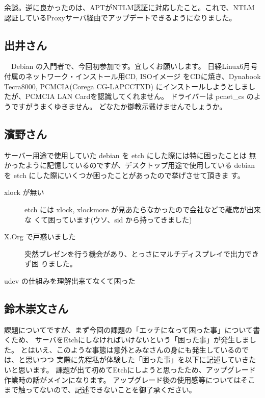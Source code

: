 \documentclass[mingoth,a4paper]{jsarticle}
\begin{document}
余談。逆に良かったのは、APTがNTLM認証に対応したこと。これで、NTLM認証しているProxyサーバ経由でアップデートできるようになりました。

\subsection{出井さん}

　Debian の入門者で、今回初参加です。宜しくお願いします。
日経Linux6月号付属のネットワーク・インストール用CD, ISOイメージ
をCDに焼き、Dynabook Tecra8000, PCMCIA(Corega CG-LAPCCTXD)
にインストールしようとしましたが、PCMCIA LAN Cardを認識してくれません。
ドライバーは pcnet\_{}cs のようですがうまくゆきません。
どなたか御教示戴けませんでしょうか。

\subsection{濱野さん}

サーバー用途で使用していた debian を etch にした際には特に困ったことは
無かったように記憶しているのですが、デスクトップ用途で使用している
debian を etch にした際にいくつか困ったことがあったので挙げさせて頂きま
す。

\begin{description}
 \item[xlock が無い]
 etch には xlock, xlockmore が見あたらなかったので会社などで離席が出来な
 くて困っています(ウソ、sid から持ってきました)

 \item[X.Org で戸惑いました]
 突然プレゼンを行う機会があり、とっさにマルチディスプレイで出力できず困
 りました。

 \item[udev の仕組みを理解出来てなくて困った]

\end{description}

\subsection{鈴木崇文さん}


課題についてですが、まず今回の課題の「エッチになって困った事」について書くため、
サーバをEtchにしなければいけないという「困った事」が発生しました。
とはいえ、このような事態は意外とみなさんの身にも発生しているのでは、と思いつつ
実際に先程私が体験した「困った事」を以下に記述していきたいと思います。
課題が出て初めてEtchにしようと思ったため、アップグレード作業時の話がメインになります。
アップグレード後の使用感等についてはそこまで触ってないので、記述できないことを御了承ください。
\end{document}
